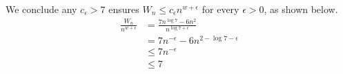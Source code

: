 \documentclass{article}
\begin{document}
We conclude any $c_{\epsilon}>7$ ensures $W_n \le c_{\epsilon}n^{w+\epsilon}$ for every $\epsilon>0$, as shown below.
\begin{align*}
    \frac{W_n}{n^{w+\epsilon}} & = \frac{7n^{\log 7} - 6n^2}{n^{\log7+\epsilon}} \\
                               & =7n^{-\epsilon}-6n^{2-\log7-\epsilon}           \\
                               & \le 7n^{-\epsilon}                              \\
                               & \le 7
\end{align*}
\end{document}

